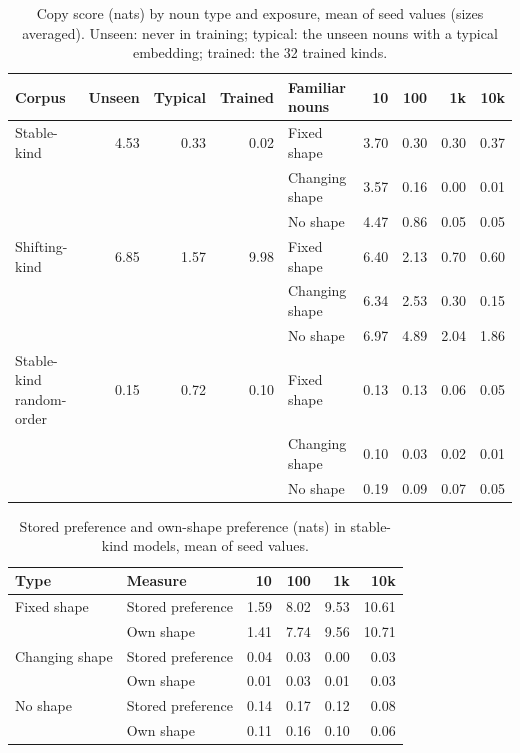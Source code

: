 \begin{table}[!htbp]
\centering\small

\begin{tabular}{@{}lrrrlrrrr@{}}
\toprule
Corpus & Unseen & Typical & Trained & Familiar nouns & 10 & 100 & 1k & 10k \\
\midrule
Stable-kind & 4.53 & \textminus{}0.33 & \textminus{}0.02 & Fixed shape & 3.70 & 0.30 & \textminus{}0.30 & \textminus{}0.37 \\
 & & & & Changing shape & 3.57 & 0.16 & 0.00 & \textminus{}0.01 \\
 & & & & No shape & 4.47 & 0.86 & 0.05 & \textminus{}0.05 \\
\addlinespace
Shifting-kind & 6.85 & 1.57 & 9.98 & Fixed shape & 6.40 & 2.13 & 0.70 & 0.60 \\
 & & & & Changing shape & 6.34 & 2.53 & 0.30 & 0.15 \\
 & & & & No shape & 6.97 & 4.89 & 2.04 & 1.86 \\
\addlinespace
Stable-kind random-order & \textminus{}0.15 & \textminus{}0.72 & \textminus{}0.10 & Fixed shape & \textminus{}0.13 & \textminus{}0.13 & \textminus{}0.06 & \textminus{}0.05 \\
 & & & & Changing shape & \textminus{}0.10 & \textminus{}0.03 & \textminus{}0.02 & \textminus{}0.01 \\
 & & & & No shape & \textminus{}0.19 & \textminus{}0.09 & \textminus{}0.07 & \textminus{}0.05 \\
\bottomrule
\end{tabular}
\caption{Copy score (nats) by noun type and exposure, mean of seed values (sizes averaged). Unseen: never in training; typical: the unseen nouns with a typical embedding; trained: the 32 trained kinds.}
\label{tab:M2}
\end{table}

\begin{table}[!htbp]
\centering\small

\begin{tabular}{@{}llrrrr@{}}
\toprule
Type & Measure & 10 & 100 & 1k & 10k \\
\midrule
Fixed shape & Stored preference & 1.59 & 8.02 & 9.53 & 10.61 \\
 & Own shape & 1.41 & 7.74 & 9.56 & 10.71 \\
Changing shape & Stored preference & 0.04 & \textminus{}0.03 & 0.00 & 0.03 \\
 & Own shape & 0.01 & \textminus{}0.03 & \textminus{}0.01 & 0.03 \\
No shape & Stored preference & \textminus{}0.14 & \textminus{}0.17 & 0.12 & 0.08 \\
 & Own shape & 0.11 & \textminus{}0.16 & 0.10 & 0.06 \\
\bottomrule
\end{tabular}
\caption{Stored preference and own-shape preference (nats) in stable-kind models, mean of seed values.}
\label{tab:M3}
\end{table}


